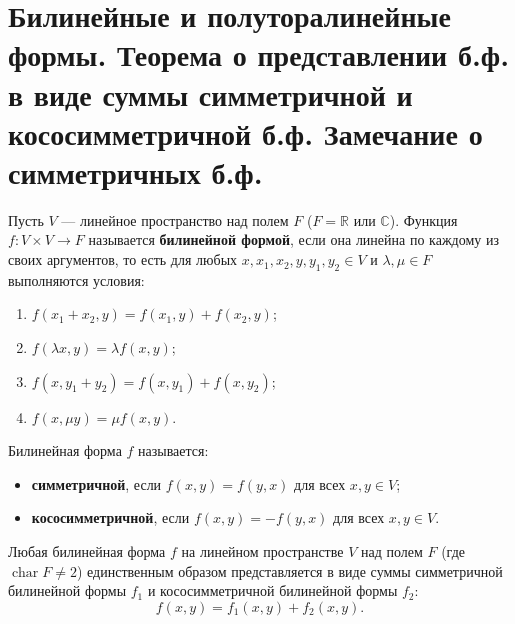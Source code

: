 \section{Билинейные и полуторалинейные формы. Теорема о представлении б.ф. в виде суммы симметричной и кососимметричной б.ф. Замечание о симметричных б.ф.}

\begin{definition}
Пусть $V$ --- линейное пространство над полем $F$ ($F = \mathbb{R}$ или $\mathbb{C}$). Функция $f: V \times V \to F$ называется \textbf{билинейной формой}, если она линейна по каждому из своих аргументов, то есть для любых $x, x_1, x_2, y, y_1, y_2 \in V$ и $\lambda, \mu \in F$ выполняются условия:
\begin{enumerate}
    \item $f(x_1 + x_2, y) = f(x_1, y) + f(x_2, y)$;
    \item $f(\lambda x, y) = \lambda f(x, y)$;
    \item $f(x, y_1 + y_2) = f(x, y_1) + f(x, y_2)$;
    \item $f(x, \mu y) = \mu f(x, y)$.
\end{enumerate}
\end{definition}

\begin{definition}
Билинейная форма $f$ называется:
\begin{itemize}
    \item \textbf{симметричной}, если $f(x, y) = f(y, x)$ для всех $x, y \in V$;
    \item \textbf{кососимметричной}, если $f(x, y) = -f(y, x)$ для всех $x, y \in V$.
\end{itemize}
\end{definition}

\begin{theorem}
Любая билинейная форма $f$ на линейном пространстве $V$ над полем $F$ (где $\operatorname{char} F \neq 2$) единственным образом представляется в виде суммы симметричной билинейной формы $f_1$ и кососимметричной билинейной формы $f_2$:
\[
f(x, y) = f_1(x, y) + f_2(x, y).
\]
\end{theorem}


